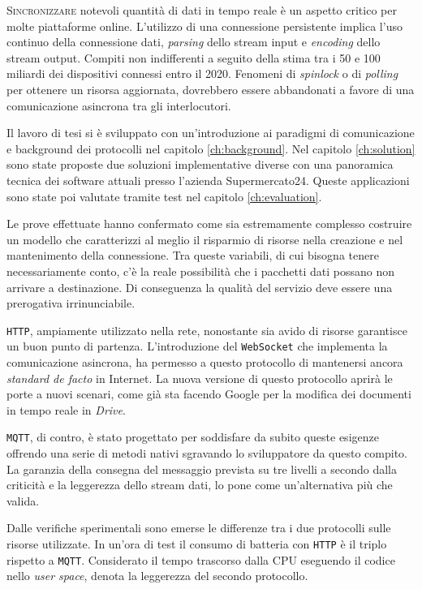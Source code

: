 \lettrine{S}{incronizzare} notevoli quantità di dati in tempo reale è un aspetto critico per molte piattaforme online.
L'utilizzo di una connessione persistente implica l'uso continuo della connessione dati, \textit{parsing} dello stream input e \textit{encoding} dello stream output.
Compiti non indifferenti a seguito della stima tra i 50 e 100 miliardi dei dispositivi connessi entro il 2020.
Fenomeni di \textit{spinlock} o di \textit{polling} per ottenere un risorsa aggiornata, dovrebbero essere abbandonati a favore di una comunicazione asincrona tra gli interlocutori.

Il lavoro di tesi si è sviluppato con un'introduzione ai paradigmi di comunicazione e background dei protocolli nel capitolo \ref{ch:background}.
Nel capitolo \ref{ch:solution} sono state proposte due soluzioni implementative diverse con una panoramica tecnica dei software attuali presso l'azienda Supermercato24.
Queste applicazioni sono state poi valutate tramite test nel capitolo \ref{ch:evaluation}.

Le prove effettuate hanno confermato come sia estremamente complesso costruire un modello che caratterizzi al meglio il risparmio di risorse nella creazione e nel mantenimento della connessione.
Tra queste variabili, di cui bisogna tenere necessariamente conto, c'è la reale possibilità che i pacchetti dati possano non arrivare a destinazione.
Di conseguenza la qualità del servizio deve essere una prerogativa irrinunciabile.

\verb+HTTP+, ampiamente utilizzato nella rete, nonostante sia avido di risorse garantisce un buon punto di partenza.
L'introduzione del \verb+WebSocket+ che implementa la comunicazione asincrona, ha permesso a questo protocollo di mantenersi ancora \textit{standard de facto} in Internet.
La nuova versione di questo protocollo aprirà le porte a nuovi scenari, come già sta facendo Google per la modifica dei documenti in tempo reale in \textit{Drive}.

\verb+MQTT+, di contro, è stato progettato per soddisfare da subito queste esigenze offrendo una serie di metodi nativi sgravando lo sviluppatore da questo compito.
La garanzia della consegna del messaggio prevista su tre livelli a secondo dalla criticità e la leggerezza dello stream dati, lo pone come un'alternativa più che valida.

Dalle verifiche sperimentali sono emerse le differenze tra i due protocolli sulle risorse utilizzate.
In un'ora di test il consumo di batteria con \verb+HTTP+ è il triplo rispetto a \verb+MQTT+.
Considerato il tempo trascorso dalla CPU eseguendo il codice nello \textit{user space}, denota la leggerezza del secondo protocollo.

